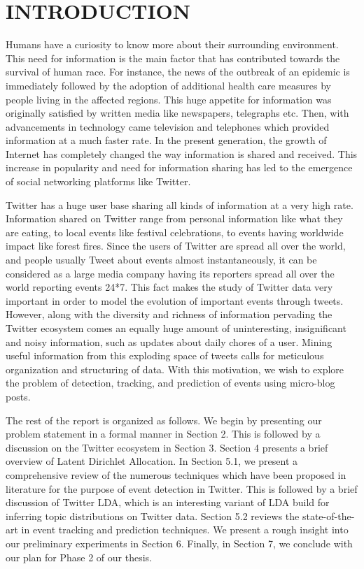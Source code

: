 \section{\uppercase{Introduction}}
Humans have a curiosity to know more about their surrounding environment. This need for information is the main factor that has contributed towards the survival of human race. For instance, the news of the outbreak of an epidemic is immediately followed by the adoption of additional health care measures by people living in the affected regions. This huge appetite for information was originally satisfied by written media like newspapers, telegraphs etc. Then, with advancements in technology came television and telephones which provided information at a much faster rate. In the present generation, the growth of Internet has completely changed the way information is shared and received. This increase in popularity and need for information sharing has led to the emergence of social networking platforms like Twitter.

Twitter has a huge user base sharing all kinds of information at a very high rate. Information shared on Twitter range from personal information like what they are eating, to local events like festival celebrations, to events having worldwide impact like forest fires. Since the users of Twitter are spread all over the world, and people usually Tweet about events almost instantaneously, it can be considered as a large media company having its reporters spread all over the world reporting events 24*7. This fact makes the study of Twitter data very important in order to model the evolution of important events through tweets. However, along with the diversity and richness of information pervading the Twitter ecosystem comes an equally huge amount of uninteresting, insignificant and noisy information, such as updates about daily chores of a user. Mining useful information from this exploding space of tweets calls for meticulous organization and structuring of data. With this motivation, we wish to explore the problem of detection, tracking, and prediction of events using micro-blog posts.

The rest of the report is organized as follows. We begin by presenting our problem statement in a formal manner in Section 2. This is followed by a discussion on the Twitter ecosystem in Section 3. Section 4 presents a brief overview of Latent Dirichlet Allocation. In Section 5.1, we present a comprehensive review of the numerous techniques which have been proposed in literature for the purpose of event detection in Twitter. This is followed by a brief discussion of Twitter LDA, which is an interesting variant of LDA build for inferring topic distributions on Twitter data. Section 5.2 reviews the state-of-the-art in event tracking and prediction techniques. We present a rough insight into our preliminary experiments in Section 6. Finally, in Section 7, we conclude with our plan for Phase 2 of our thesis.